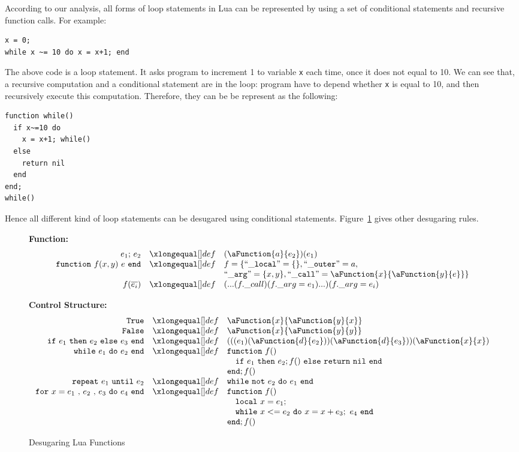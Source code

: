 According to our analysis, all forms of loop statements in Lua can be represented by using a set of conditional statements and recursive function calls. For example:

\begin{verbatim}
x = 0;
while x ~= 10 do x = x+1; end
\end{verbatim}

The above code is a loop statement. It asks program to increment 1 to variable {\tt x} each time, once it does not equal to 10. We can see that, a recursive computation and a conditional statement are in the loop: program have to depend whether {\tt x} is equal to 10, and then recursively execute this computation. Therefore, they can be be represent as the following:

\begin{verbatim}
function while()
  if x~=10 do
    x = x+1; while()
  else
    return nil
  end
end;
while()
\end{verbatim}

Hence all different kind of loop statements can be desugared using conditional statements. Figure~\ref{fig:desLuaFunc} gives other desugaring rules.

\begin{figure}
\caption{Desugaring Lua Functions}\label{fig:desLuaFunc}
{\bf Function:}\[
\begin{array}{rclcl}
\desugar{e_1{\tt ;}~e_2}{(\aFunction{a}{e_2})(e_1)}
\desugar{{\tt function}~f(x,y)~e~{\tt end}}{f = \{ {\tt ``\_local"} = \{\}, {\tt ``\_outer"} = a,}
\desugarline{{\tt ``\_arg"} = \{x, y\}, {\tt ``\_call"} = \aFunction{x}{\aFunction{y}{e}}\}}
\desugar{f(\overline{e_i})}{(...(f.\_call)(f.\_arg = e_1)...)(f.\_arg = e_i)}
\end{array}\]

{\bf Control Structure:}\[
\begin{array}{rclcl}

\desugar{\tt True}{\aFunction{x}{\aFunction{y}{x}}}
\desugar{\tt False}{\aFunction{x}{\aFunction{y}{y}}}
\desugar{
    {\tt if}~e_1~{\tt then}~e_2~{\tt else}~e_3~{\tt end}
}{
    (((e_1)(\aFunction{d}{e_2}))(\aFunction{d}{e_3}))(\aFunction{x}{x})
}
\desugar{{\tt while}~e_1~{\tt do}~e_2~{\tt end}}{
    {\tt function}~f()
}
\desugarline{ \quad{\tt if}~e_1~{\tt then}~e_2;f()~{\tt else}~{\tt return}~{\tt nil}~{\tt end}\\
{\tt end};f()
}
\desugar{{\tt repeat}~e_1~{\tt until}~e_2}{
   {\tt while}~{\tt not}~e_2~{\tt do}~e_1~{\tt end}\\
}
\desugar{{\tt for}~x=e_1~{\tt ,}~e_2~{\tt ,}~e_3~{\tt do}~e_4~{\tt end}}{
    {\tt function}~f()
}
\desugarline{
    \quad {\tt local}~x = e_1;\\
    \quad {\tt while}~x<= e_2~{\tt do}~x = x + e_3;~e_4~{\tt end}\\
    {\tt end};f()\\
}
\end{array}\]
\end{figure}
